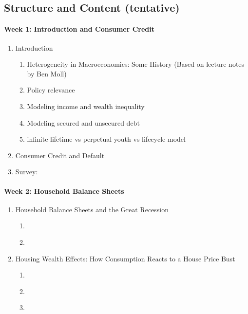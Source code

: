 \documentclass[a4paper,11pt]{article}
\begin{document}
\subsection*{Structure and Content (tentative)}

\paragraph{Week 1: Introduction and Consumer Credit}
\begin{enumerate}
\item Introduction
  \begin{enumerate}
  \item Heterogeneity in Macroeconomics: Some History (Based on lecture notes by Ben Moll)
  \item Policy relevance
  \item Modeling income and wealth inequality
  \item Modeling secured and unsecured debt
  \item infinite lifetime vs perpetual youth vs lifecycle model
  \end{enumerate}

\item Consumer Credit and Default \citep{athreya2002welfare,chatterjee2007quantitative,livshits2007consumer}
\item Survey: \citet{exler2020consumer}
\end{enumerate}

\paragraph{Week 2: Household Balance Sheets}

\begin{enumerate}
\item Household Balance Sheets and the Great Recession
  \begin{enumerate}
  \item \cite{mian2013household}
  \item \cite{berger2015consumption}
  \end{enumerate}
\item Housing Wealth Effects: How Consumption Reacts to a House Price Bust
  \begin{enumerate}
  \item \cite{berger2018house}
  \item \cite{guren2021housing}
  \item \cite{greimel2019understanding}
  \end{enumerate}
\end{enumerate}
\end{document}
